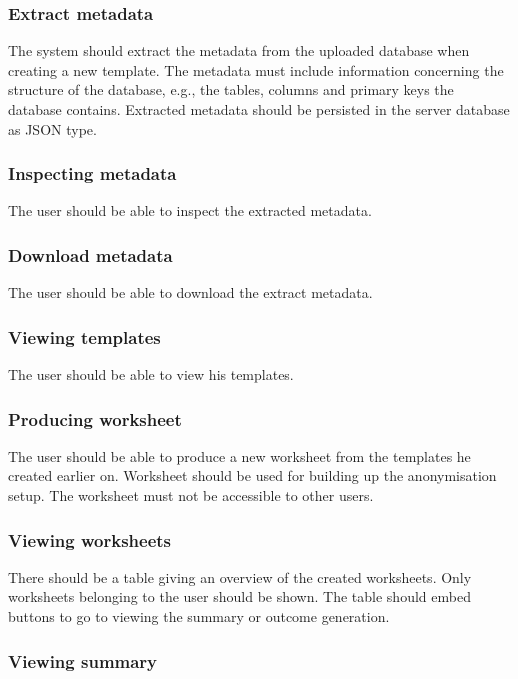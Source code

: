 \documentclass[a4paper,twoside,12pt]{book}
\begin{document}
\subsubsection{Extract metadata}

The system should extract the metadata from the uploaded database when creating a new template. The metadata must include information concerning the structure of the database, e.g., the tables, columns and primary keys the database contains. Extracted metadata should be persisted in the server database as JSON type. 

\subsubsection{Inspecting metadata}

The user should be able to inspect the extracted metadata.

\subsubsection{Download metadata}

The user should be able to download the extract metadata.

\subsubsection{Viewing templates}

The user should be able to view his templates.

\subsubsection{Producing worksheet}

The user should be able to produce a new worksheet from the templates he created earlier on. Worksheet should be used for building up the anonymisation setup. The worksheet must not be accessible to other users.

\subsubsection{Viewing worksheets}

There should be a table giving an overview of the created worksheets. Only worksheets belonging to the user should be shown. The table should embed buttons to go to viewing the summary or outcome generation.

\subsubsection{Viewing summary}
\end{document}
